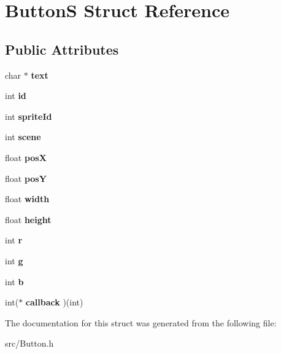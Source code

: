 \hypertarget{struct_button_s}{}\section{ButtonS Struct Reference}
\label{struct_button_s}
\subsection*{Public Attributes}
\begin{DoxyCompactItemize}
\item 
\mbox{\label{struct_button_s_a1472d4647423c83d45e4cbdb47c83c6d}} 
char $\ast$ {\bfseries text}
\item 
\mbox{\label{struct_button_s_a27f6bcf4289ea1683f843e077e08663b}} 
int {\bfseries id}
\item 
\mbox{\label{struct_button_s_a877af6fad7f21b78e8410961d6e657de}} 
int {\bfseries sprite\+Id}
\item 
\mbox{\label{struct_button_s_ac309a084a6a5fddffc41aa3347070e1a}} 
int {\bfseries scene}
\item 
\mbox{\label{struct_button_s_a0a7ff1cff4b5c35552ef4d006caa83a8}} 
float {\bfseries posX}
\item 
\mbox{\label{struct_button_s_a72f32d2935f08a32ab81d1e542f01620}} 
float {\bfseries posY}
\item 
\mbox{\label{struct_button_s_aadb7b9512c6e032223e2b4b3bbb5fd8f}} 
float {\bfseries width}
\item 
\mbox{\label{struct_button_s_a5910c1866330bff6f14855cc2692def9}} 
float {\bfseries height}
\item 
\mbox{\label{struct_button_s_a1e5c75c62cd1108540340ff3641ac8b3}} 
int {\bfseries r}
\item 
\mbox{\label{struct_button_s_a2cb4f7b2ebbc3588bf8fd9a00bdbf184}} 
int {\bfseries g}
\item 
\mbox{\label{struct_button_s_adcc0378cc3208bc12e6c516e46a63e1f}} 
int {\bfseries b}
\item 
\mbox{\label{struct_button_s_af0135c3c34636d2198a07e5adc9ebb9c}} 
int($\ast$ {\bfseries callback} )(int)
\end{DoxyCompactItemize}


The documentation for this struct was generated from the following file\+:\begin{DoxyCompactItemize}
\item 
src/Button.\+h\end{DoxyCompactItemize}
